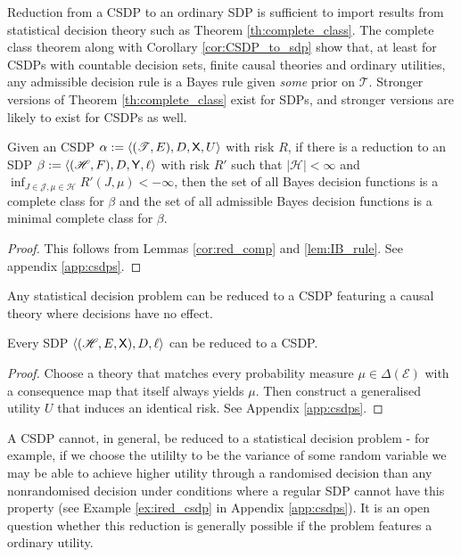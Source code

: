 Reduction from a CSDP to an ordinary SDP is sufficient to import results from statistical decision theory such as Theorem \ref{th:complete_class}. The complete class theorem along with Corollary \ref{cor:CSDP_to_sdp} show that, at least for CSDPs with countable decision sets, finite causal theories and ordinary utilities, any admissible decision rule is a Bayes rule given \emph{some} prior on $\mathscr{T}$. Stronger versions of Theorem \ref{th:complete_class} exist for SDPs, and stronger versions are likely to exist for CSDPs as well.

\begin{theorem}\label{th:complete_class}
Given an CSDP $\alpha:=\langle (\mathscr{T},E),D,\mathsf{X},U\rangle$ with risk $R$, if there is a reduction to an SDP $\beta:=\langle (\mathscr{H},F),D,\mathsf{Y},\ell \rangle$ with risk $R'$ such that $|\mathscr{H}|<\infty$ and $\inf_{J\in\mathscr{J},\mu\in\mathscr{H}} R'(J,\mu)<-\infty$, then the set of all Bayes decision functions is a complete class for $\beta$ and the set of all admissible Bayes decision functions is a minimal complete class for $\beta$.
\end{theorem}

\begin{proof}
This follows from Lemmas \ref{cor:red_comp} and \ref{lem:IB_rule}. See appendix \ref{app:csdps}.
\end{proof}

Any statistical decision problem can be reduced to a CSDP featuring a causal theory where decisions have no effect.

\begin{theorem}\label{th:sdp_to_CSDP}
Every SDP $\langle (\mathscr{H},E,\mathsf{X}),D,\ell\rangle$ can be reduced to a CSDP.
\end{theorem}
\begin{proof}
Choose a theory that matches every probability measure $\mu\in\Delta(\mathcal{E})$ with a consequence map that itself always yields $\mu$. Then construct a generalised utility $U$ that induces an identical risk. See Appendix \ref{app:csdps}.
\end{proof}


A CSDP cannot, in general, be reduced to a statistical decision problem - for example, if we choose the utililty to be the variance of some random variable we may be able to achieve higher utility through a randomised decision than any nonrandomised decision under conditions where a regular SDP cannot have this property (see Example \ref{ex:ired_csdp} in Appendix \ref{app:csdps}). It is an open question whether this reduction is generally possible if the problem features a ordinary utility.


